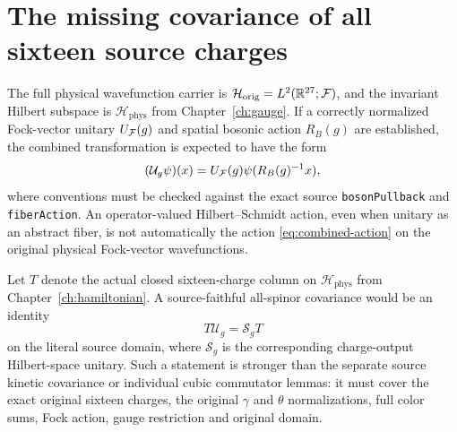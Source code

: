 \section{The missing covariance of all sixteen source charges}
The full physical wavefunction carrier is
$\mathcal H_{\mathrm{orig}}=L^2(\mathbb R^{27};\mathcal F)$, and the invariant
Hilbert subspace is $\mathcal H_{\mathrm{phys}}$ from
Chapter~\ref{ch:gauge}. If a correctly normalized Fock-vector
unitary $U_{\mathcal F}(g)$ and spatial bosonic action $R_B(g)$ are
established, the combined transformation is expected to have the form
\begin{equation}\label{eq:combined-action}
 (\mathcal U_g\psi)(x)
   =U_{\mathcal F}(g)\psi(R_B(g)^{-1}x),
\end{equation}
where conventions must be checked against the exact source
\texttt{bosonPullback} and \texttt{fiberAction}. An operator-valued
Hilbert--Schmidt action, even when unitary as an abstract fiber, is
not automatically the action \eqref{eq:combined-action} on the
original physical Fock-vector wavefunctions.

Let $T$ denote the actual closed sixteen-charge column on
$\mathcal H_{\mathrm{phys}}$ from Chapter~\ref{ch:hamiltonian}.
A source-faithful all-spinor covariance would be an identity
\begin{equation}\label{eq:full-charge-covariance-target}
 T\mathcal U_g=\mathcal S_g T
\end{equation}
on the literal source domain, where $\mathcal S_g$ is the corresponding
charge-output Hilbert-space unitary. Such a statement is stronger
than the separate source kinetic covariance or individual cubic
commutator lemmas: it must cover the exact original sixteen charges,
the original $\gamma$ and $\theta$ normalizations, full color sums,
Fock action, gauge restriction and original domain.

